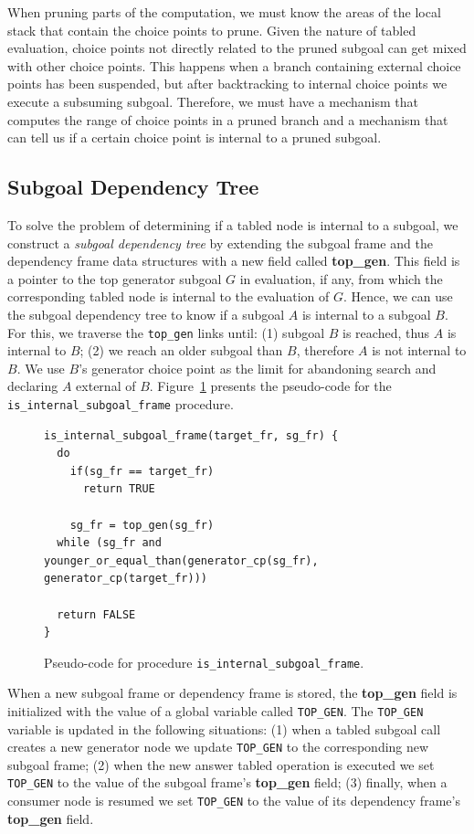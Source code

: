 When pruning parts of the computation, we must know the areas of the local stack
that contain the choice points to prune. Given the nature of tabled evaluation, choice points not
directly related to the pruned subgoal can get mixed with other choice points. This happens when a branch
containing external choice points has been suspended, but after backtracking to internal choice points we
execute a subsuming subgoal. Therefore, we must have a mechanism that computes the range of choice points
in a pruned branch and a mechanism that can tell us if a certain choice point is internal to a pruned subgoal.

\subsection{Subgoal Dependency Tree}

To solve the problem of determining if a tabled node is internal to a subgoal,
we construct a \emph{subgoal dependency tree} by extending the subgoal frame and the
dependency frame data structures with a new field called \textbf{top\_gen}. This field is a pointer to
the top generator subgoal $G$ in evaluation, if any, from which the corresponding tabled node is
internal to the evaluation of $G$.
Hence, we can use the subgoal dependency tree to know if a subgoal $A$ is internal
to a subgoal $B$. For this, we traverse the \texttt{top\_gen} links until:
(1) subgoal $B$ is reached, thus $A$ is internal to $B$; (2) we reach an older subgoal
than $B$, therefore $A$ is not internal to $B$. We use $B$'s generator choice point
as the limit for abandoning search and declaring $A$ external of $B$.
Figure~\ref{fig:is_internal_subgoal_frame} presents the pseudo-code for the
\texttt{is\_internal\_subgoal\_frame} procedure.

\begin{figure}[ht]
\begin{Verbatim}
is_internal_subgoal_frame(target_fr, sg_fr) {
  do
    if(sg_fr == target_fr)
      return TRUE
    
    sg_fr = top_gen(sg_fr)
  while (sg_fr and younger_or_equal_than(generator_cp(sg_fr), generator_cp(target_fr)))
  
  return FALSE
}
\end{Verbatim}
\caption{Pseudo-code for procedure \texttt{is\_internal\_subgoal\_frame}.}
\label{fig:is_internal_subgoal_frame}
\end{figure}

When a new subgoal frame or dependency frame is stored, the \textbf{top\_gen} field is initialized
with the value of a global variable called \texttt{TOP\_GEN}. The \texttt{TOP\_GEN} variable is updated in the following
situations: (1) when a tabled subgoal call creates a new generator node we update
\texttt{TOP\_GEN} to the corresponding new subgoal frame; (2) when the new answer tabled operation
is executed we set \texttt{TOP\_GEN} to the value of the subgoal frame's \textbf{top\_gen}
field; (3) finally, when a consumer node is resumed we set \texttt{TOP\_GEN} to the value
of its dependency frame's \textbf{top\_gen} field.

